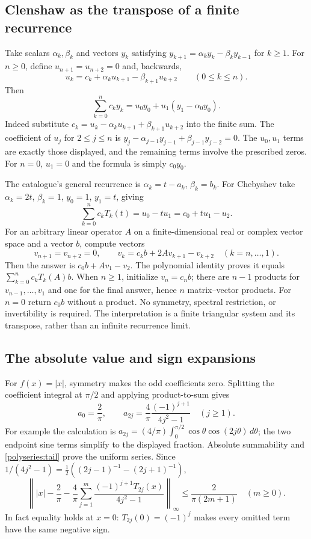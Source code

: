 \documentclass[11pt]{article}
\theoremstyle{remark}
\numberwithin{equation}{section}
\begin{document}
\subsection{Clenshaw as the transpose of a finite recurrence}
\label{polyseries:clenshaw}
Take scalars $\alpha_k,\beta_k$ and vectors $y_k$ satisfying
$y_{k+1}=\alpha_ky_k-\beta_ky_{k-1}$ for $k\ge1$.
For $n\ge0$, define $u_{n+1}=u_{n+2}=0$ and, backwards,
\[
 u_k=c_k+\alpha_ku_{k+1}-\beta_{k+1}u_{k+2}
 \qquad(0\le k\le n).
\]
Then
\begin{equation}\label{polyseries:clenshawidentity}
 \sum_{k=0}^nc_ky_k=u_0y_0+u_1(y_1-\alpha_0y_0).
\end{equation}
Indeed substitute
$c_k=u_k-\alpha_ku_{k+1}+\beta_{k+1}u_{k+2}$ into the finite sum.
The coefficient of $u_j$ for $2\le j\le n$ is
$y_j-\alpha_{j-1}y_{j-1}+\beta_{j-1}y_{j-2}=0$.
The $u_0,u_1$ terms are exactly those displayed, and the remaining
terms involve the prescribed zeros. For $n=0$, $u_1=0$ and the formula
is simply $c_0y_0$.

The catalogue's general recurrence is $\alpha_k=t-a_k$,
$\beta_k=b_k$. For Chebyshev take $\alpha_k=2t$, $\beta_k=1$,
$y_0=1$, $y_1=t$, giving
\[
 \sum_{k=0}^nc_kT_k(t)=u_0-tu_1
 =c_0+tu_1-u_2.
\]
For an arbitrary linear operator $A$ on a finite-dimensional real or
complex vector space and a vector $b$, compute vectors
\[
 v_{n+1}=v_{n+2}=0,\qquad
 v_k=c_kb+2Av_{k+1}-v_{k+2}\quad(k=n,\ldots,1).
\]
Then the answer is $c_0b+Av_1-v_2$. The polynomial identity proves it
equals $\sum_{k=0}^nc_kT_k(A)b$. When $n\ge1$, initialize $v_n=c_nb$;
there are $n-1$ products for $v_{n-1},\ldots,v_1$ and one for the final
answer, hence $n$ matrix--vector products. For $n=0$ return $c_0b$
without a product. No symmetry, spectral restriction, or invertibility
is required. The interpretation is a finite triangular system and its
transpose, rather than an infinite recurrence limit.

\subsection{The absolute value and sign expansions}
\label{polyseries:abs-sign}
For $f(x)=|x|$, symmetry makes the odd coefficients zero. Splitting the
coefficient integral at $\pi/2$ and applying product-to-sum gives
\[
 a_0=\frac2\pi,\qquad
 a_{2j}=\frac4\pi\frac{(-1)^{j+1}}{4j^2-1}\quad(j\ge1).
\]
For example the calculation is
$a_{2j}=(4/\pi)\int_0^{\pi/2}\cos\theta\cos(2j\theta)\,d\theta$;
the two endpoint sine terms simplify to the displayed fraction.
Absolute summability and \eqref{polyseries:tail} prove the uniform series.
Since
$1/(4j^2-1)=\tfrac12((2j-1)^{-1}-(2j+1)^{-1})$,
\begin{equation}\label{polyseries:abstail}
 \left\||x|-\frac2\pi-\frac4\pi\sum_{j=1}^m
      \frac{(-1)^{j+1}T_{2j}(x)}{4j^2-1}\right\|_\infty
 \le\frac2{\pi(2m+1)}\quad(m\ge0).
\end{equation}
In fact equality holds at $x=0$: $T_{2j}(0)=(-1)^j$ makes every
omitted term have the same negative sign.
\end{document}
